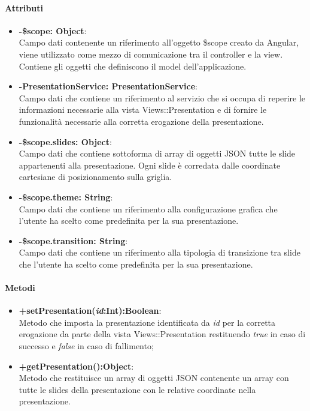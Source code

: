 	\paragraph{Attributi}
	\begin{itemize}
		\item \textbf{-\$scope: Object}:\\
			Campo dati contenente un riferimento all'oggetto \$scope creato da Angular, viene utilizzato come mezzo di comunicazione tra il controller e la view. Contiene gli oggetti che definiscono il model dell'applicazione.
		\item \textbf{-PresentationService: PresentationService}:\\
			Campo dati che contiene un riferimento al servizio che si occupa di reperire le informazioni necessarie alla vista Views::Presentation e di fornire le funzionalità necessarie alla corretta erogazione della presentazione.
		\item \textbf{-\$scope.slides: Object}:\\
			Campo dati che contiene sottoforma di array di oggetti JSON tutte le slide appartenenti alla presentazione. Ogni slide è corredata dalle coordinate cartesiane di posizionamento sulla griglia.
		
		\item \textbf{-\$scope.theme: String}:\\
			Campo dati che contiene un riferimento alla configurazione grafica che l'utente ha scelto come predefinita per la sua presentazione.
		
		\item \textbf{-\$scope.transition: String}:\\
			Campo dati che contiene un riferimento alla tipologia di transizione tra slide che l'utente ha scelto come predefinita per la sua presentazione.
	\end{itemize}
	
	\paragraph{Metodi}
	\begin{itemize}
	  \item \textbf{+setPresentation(\textit{id}:Int):Boolean}:\\
		  Metodo che imposta la presentazione identificata da  \textit{id} per la corretta erogazione da parte della vista Views::Presentation restituendo \textit{true} in caso di successo e \textit{false} in caso di fallimento;
	  \item \textbf{+getPresentation():Object}:\\
		  Metodo che restituisce un array di oggetti JSON contenente un array con tutte le slides della presentazione con le relative coordinate nella presentazione.
		  
	\end{itemize}
